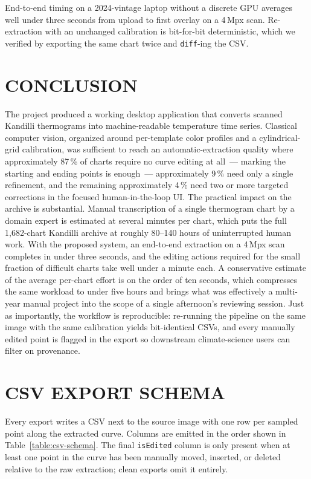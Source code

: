 \documentclass[a4paper,12pt]{report}
\begin{document}
End-to-end timing on a 2024-vintage laptop without a discrete GPU averages well under three seconds from upload to first overlay on a 4\,Mpx scan. Re-extraction with an unchanged calibration is bit-for-bit deterministic, which we verified by exporting the same chart twice and \texttt{diff}-ing the CSV.

\chapter{CONCLUSION}

The project produced a working desktop application that converts scanned Kandilli thermograms into machine-readable temperature time series. Classical computer vision, organized around per-template color profiles and a cylindrical-grid calibration, was sufficient to reach an automatic-extraction quality where approximately 87\,\% of charts require no curve editing at all~--- marking the starting and ending points is enough~--- approximately 9\,\% need only a single refinement, and the remaining approximately 4\,\% need two or more targeted corrections in the focused human-in-the-loop UI. The practical impact on the archive is substantial. Manual transcription of a single thermogram chart by a domain expert is estimated at several minutes per chart, which puts the full 1{,}682-chart Kandilli archive at roughly 80--140 hours of uninterrupted human work. With the proposed system, an end-to-end extraction on a 4\,Mpx scan completes in under three seconds, and the editing actions required for the small fraction of difficult charts take well under a minute each. A conservative estimate of the average per-chart effort is on the order of ten seconds, which compresses the same workload to under five hours and brings what was effectively a multi-year manual project into the scope of a single afternoon's reviewing session. Just as importantly, the workflow is reproducible: re-running the pipeline on the same image with the same calibration yields bit-identical CSVs, and every manually edited point is flagged in the export so downstream climate-science users can filter on provenance.





\appendix

\chapter{CSV EXPORT SCHEMA}

Every export writes a CSV next to the source image with one row per sampled point along the extracted curve. Columns are emitted in the order shown in Table~\ref{table:csv-schema}. The final \texttt{isEdited} column is only present when at least one point in the curve has been manually moved, inserted, or deleted relative to the raw extraction; clean exports omit it entirely.
\end{document}
